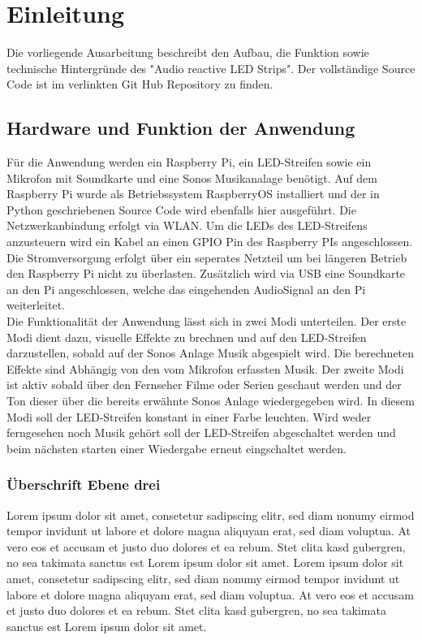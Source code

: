 \chapter{Einleitung}

Die vorliegende Ausarbeitung beschreibt den Aufbau, die Funktion sowie technische Hintergründe des "Audio reactive LED Strips".
Der vollständige Source Code ist im verlinkten Git Hub Repository zu finden.

\section{Hardware und Funktion der Anwendung}
Für die Anwendung werden ein Raspberry Pi, ein LED-Streifen sowie ein Mikrofon mit Soundkarte und eine Sonos Musikanalage benötigt.
Auf dem Raspberry Pi wurde als Betriebssystem RaspberryOS installiert und der in Python geschriebenen Source Code wird ebenfalls hier
ausgeführt. Die Netzwerkanbindung erfolgt via WLAN.
Um die LEDs des LED-Streifens anzusteuern wird ein Kabel an einen GPIO Pin des Raspberry PIs angeschlossen. Die Stromversorgung erfolgt über ein seperates Netzteil um
bei längeren Betrieb den Raspberry Pi nicht zu überlasten. Zusätzlich wird via USB eine Soundkarte an den Pi angeschlossen, welche das eingehenden AudioSignal an den Pi weiterleitet.
\\
Die Funktionalität der Anwendung lässt sich in zwei Modi unterteilen. Der erste Modi dient dazu, visuelle Effekte zu brechnen und auf den
LED-Streifen darzustellen, sobald auf der Sonos Anlage Musik abgespielt wird. Die berechneten Effekte sind Abhängig von den vom Mikrofon 
erfassten Musik. Der zweite Modi ist aktiv sobald über den Fernseher Filme oder Serien geschaut werden und der Ton dieser über die bereits
erwähnte Sonos Anlage wiedergegeben wird. In diesem Modi soll der LED-Streifen konstant in einer Farbe leuchten. 
Wird weder ferngesehen noch Musik gehört soll der LED-Streifen abgeschaltet werden und beim nächsten starten einer Wiedergabe
erneut eingschaltet werden.




\subsection{Überschrift Ebene drei}

Lorem ipsum dolor sit amet, consetetur sadipscing elitr, sed diam nonumy eirmod tempor invidunt ut labore et dolore magna aliquyam erat, sed diam voluptua. At vero eos et accusam et justo duo dolores et ea rebum. Stet clita kasd gubergren, no sea takimata sanctus est Lorem ipsum dolor sit amet. Lorem ipsum dolor sit amet, consetetur sadipscing elitr, sed diam nonumy eirmod tempor invidunt ut labore et dolore magna aliquyam erat, sed diam voluptua. At vero eos et accusam et justo duo dolores et ea rebum. Stet clita kasd gubergren, no sea takimata sanctus est Lorem ipsum dolor sit amet.

